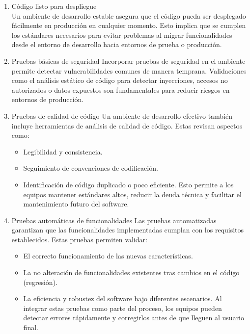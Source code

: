 \begin{enumerate}
    \item Código listo para despliegue\\
    Un ambiente de desarrollo estable asegura que el código pueda ser desplegado fácilmente en producción en cualquier momento. Esto implica que se 
    cumplen los estándares necesarios para evitar problemas al migrar funcionalidades desde el entorno de desarrollo hacia entornos de prueba o producción.
    \item Pruebas básicas de seguridad
    Incorporar pruebas de seguridad en el ambiente permite detectar vulnerabilidades comunes de manera temprana. Validaciones como el análisis estático de 
    código para detectar inyecciones, accesos no autorizados o datos expuestos son fundamentales para reducir riesgos en entornos de producción.
    \item Pruebas de calidad de código
    Un ambiente de desarrollo efectivo también incluye herramientas de análisis de calidad de código. Estas revisan aspectos como:
    \begin{itemize}
        \item Legibilidad y consistencia.
        \item Seguimiento de convenciones de codificación.
        \item Identificación de código duplicado o poco eficiente. Esto permite a los equipos mantener estándares altos, reducir la deuda técnica y facilitar 
        el mantenimiento futuro del software.
    \end{itemize}
    \item Pruebas automáticas de funcionalidades
    Las pruebas automatizadas garantizan que las funcionalidades implementadas cumplan con los requisitos establecidos. Estas pruebas permiten validar:
    \begin{itemize}
        \item El correcto funcionamiento de las nuevas características.
        \item La no alteración de funcionalidades existentes tras cambios en el código (regresión).
        \item La eficiencia y robustez del software bajo diferentes escenarios. Al integrar estas pruebas como parte del proceso, los equipos pueden detectar 
        errores rápidamente y corregirlos antes de que lleguen al usuario final.
    \end{itemize}
\end{enumerate}



